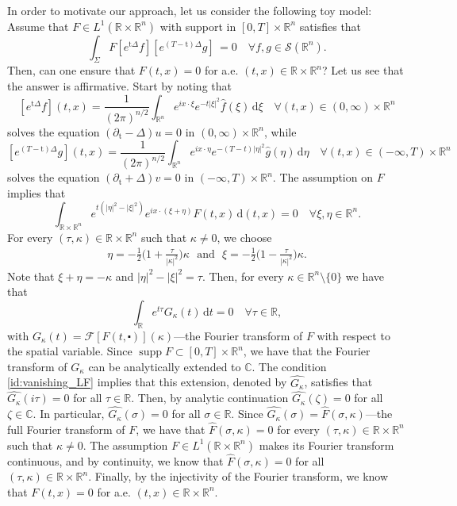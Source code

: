 \documentclass[10pt,a4paper]{amsart}
\theoremstyle{remark}
\theoremstyle{definition}
\DeclareMathOperator{\supp}{supp}
\newcommand{\R}{\mathbb{R}}
\newcommand{\C}{\mathbb{C}}
\newcommand{\dd}{\mathrm{d}}
\newcommand{\tm}{\mathrm{t}}
\begin{document}
In order to motivate our approach, let us 
consider the following toy model: Assume that 
$F \in L^1(\R \times \R^n)$ with support in $[0, T] \times \R^n$ satisfies that
\[ \int_\Sigma F  [e^{\tm \Delta}f] [e^{(T - \tm) \Delta}g] \, = 0 \quad \forall f, g \in \mathcal{S}(\R^n). \]
Then, can one ensure that $F(t, x) = 0$ for a.e.
$(t, x) \in \R \times \R^n$? Let us see that the answer is affirmative.
Start by noting that
\[ [e^{\tm \Delta}f] (t,x) = \frac{1}{(2\pi)^{n/2}} \int_{\R^n} e^{ix \cdot \xi} e^{-t|\xi|^2} \widehat{f}(\xi) \, \dd \xi \quad \forall (t, x) \in (0, \infty) \times \R^n \]
solves the equation $(\partial_\tm - \Delta) u = 0$ in $(0, \infty) \times \R^n$, while
\[ [e^{(T - \tm) \Delta}g] (t,x) = \frac{1}{(2\pi)^{n/2}} \int_{\R^n} e^{ix \cdot \eta} e^{-(T-t)|\eta|^2} \widehat{g}(\eta) \, \dd \eta \quad \forall (t, x) \in (-\infty, T) \times \R^n \]
solves the equation $(\partial_\tm + \Delta) v = 0$ in $(-\infty, T) \times \R^n$. The 
assumption on $F$ implies that
\[ \int_{\R \times \R^n} e^{t(|\eta|^2 - |\xi|^2)} e^{i x \cdot (\xi + \eta)} F(t, x) \, \dd (t, x) = 0 \quad \forall \xi, \eta \in \R^n. \]
For every $(\tau, \kappa) \in \R \times \R^n$ such that $\kappa \neq 0$, we choose
\begin{align*}
    \eta=- \frac{1}{2}\big(1+\frac{\tau}{|\kappa|^2}\big)\kappa   ~~~\text{and}~~~\xi= -\frac{1}{2}\big(1-\frac{\tau}{|\kappa|^2}\big)\kappa.
\end{align*}
Note that $\xi+\eta = - \kappa$ and $|\eta|^2 - |\xi|^2 = \tau$.
Then, for every $\kappa \in \R^n \setminus \{ 0 \}$ we have that
\begin{equation}
\label{id:vanishing_LF}
\int_\R e^{t\tau} G_\kappa (t) \,\dd t = 0 \quad \forall \tau \in \R,
\end{equation}
with $ G_\kappa (t) = \mathcal{F}[F(t, \centerdot)](\kappa) $---the Fourier transform of $F$
with respect to the spatial variable.
Since $\supp F \subset [0,T] \times \R^n$, we have that the Fourier transform of $G_\kappa$ 
can be analytically extended to $\C$. The condition 
\eqref{id:vanishing_LF} implies that this extension, denoted by $\widehat{G_\kappa}$, 
satisfies that $\widehat{G_\kappa}(i\tau) = 0$ for all $\tau \in \R$. Then, by analytic 
continuation $\widehat{G_\kappa}(\zeta) = 0$ for all $\zeta \in \C$. In particular,
$\widehat{G_\kappa}(\sigma) = 0$ for all $\sigma \in \R$. Since 
$\widehat{G_\kappa}(\sigma) = \widehat{F}(\sigma, \kappa)$---the full Fourier transform of 
$F$, we have that $\widehat{F}(\sigma, \kappa) = 0$ for every
$(\tau, \kappa) \in \R \times \R^n$ such that $\kappa \neq 0$. The assumption 
$F \in L^1(\R \times \R^n)$ makes its Fourier transform continuous, and by continuity, we 
know that $\widehat{F}(\sigma, \kappa) = 0$ for all $(\tau, \kappa) \in \R \times \R^n$.
Finally, by the injectivity of the Fourier transform, we know that $F(t, x) = 0$ for 
a.e. $(t, x) \in \R \times \R^n$.
\end{document}
